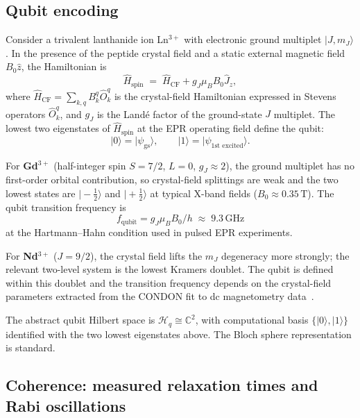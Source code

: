\documentclass[11pt,oneside]{amsbook}
\numberwithin{equation}{section}
\theoremstyle{plain}
\theoremstyle{definition}
\theoremstyle{remark}
\begin{document}
\subsection{Qubit encoding}
\label{subsec:pqpu_encoding}

Consider a trivalent lanthanide ion Ln$^{3+}$ with electronic ground multiplet
$|J, m_J\rangle$.  In the presence of the peptide crystal field and a static
external magnetic field $B_0\hat{z}$, the Hamiltonian is
\begin{equation}
  \hat{H}_{\text{spin}} \;=\; \hat{H}_{\text{CF}} + g_J \mu_B B_0 \hat{J}_z,
\label{eq:H_spin}
\end{equation}
where $\hat{H}_{\text{CF}} = \sum_{k,q} B_k^q \hat{O}_k^q$ is the crystal-field
Hamiltonian expressed in Stevens operators $\hat{O}_k^q$, and $g_J$ is the
Land\'e factor of the ground-state $J$ multiplet.  The lowest two eigenstates of
$\hat{H}_{\text{spin}}$ at the EPR operating field define the qubit:
\[
  |0\rangle = |\psi_{\text{gs}}\rangle, \qquad
  |1\rangle = |\psi_{\text{1st excited}}\rangle.
\]

For \textbf{Gd$^{3+}$} (half-integer spin $S = 7/2$, $L = 0$, $g_J \approx 2$),
the ground multiplet has no first-order orbital contribution, so crystal-field
splittings are weak and the two lowest states are
$|\!-\!\tfrac{1}{2}\rangle$ and $|\!+\!\tfrac{1}{2}\rangle$ at typical X-band
fields ($B_0 \approx 0.35\,\text{T}$).  The qubit transition frequency is
\[
  f_{\text{qubit}} = g_J \mu_B B_0 / h \;\approx\; 9.3\,\text{GHz}
\]
at the Hartmann--Hahn condition used in pulsed EPR experiments.

For \textbf{Nd$^{3+}$} ($J = 9/2$), the crystal field lifts the $m_J$
degeneracy more strongly; the relevant two-level system is the lowest Kramers
doublet.  The qubit is defined within this doublet and the transition frequency
depends on the crystal-field parameters extracted from the CONDON fit to dc
magnetometry data~\cite{RosalenyEtAl2017}.

The abstract qubit Hilbert space is $\mathcal{H}_q \cong \mathbb{C}^2$, with
computational basis $\{|0\rangle, |1\rangle\}$ identified with the two lowest
eigenstates above.  The Bloch sphere representation is standard.

\subsection{Coherence: measured relaxation times and Rabi oscillations}
\label{subsec:pqpu_coherence}
\end{document}
